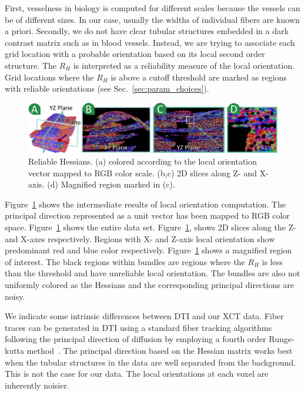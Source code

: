 First, vesselness in biology is computed for different scales because the vessels can be of different sizes. In our case, usually the widths of individual fibers are known a priori.
Secondly, we do not have clear tubular structures embedded in a dark contrast matrix such as in blood vessels.
Instead, we are trying to associate each grid location  with a probable orientation based on its local second order structure. The $R_{H}$ is interpreted as a reliability measure of the local orientation.
Grid locations where the $R_{H}$ is above a cutoff threshold are marked as regions with reliable orientations (see Sec.~\ref{sec:param_choices}).

\begin{figure}[tb]
\centering
\includegraphics[width=\linewidth]{images/reliable_hessian.eps}
 \vspace{-1.5em}
\caption{Reliable Hessians. (a) \mt colored according to the local orientation vector mapped to RGB color scale. (b,c) 2D slices along Z- and X- axis. (d) Magnified region marked in (c).}
\label{fig:reliable_hessian}
\vskip-0.2cm
\end{figure}
Figure~\ref{fig:reliable_hessian} shows the intermediate results of local orientation computation.
The principal direction represented as a unit vector has been mapped to RGB color space.
Figure~\ref{fig:reliable_hessian} shows the entire data set. 
Figure~\ref{fig:reliable_hessian}, shows 2D slices along the Z- and X-axes respectively. Regions with X- and Z-axis local orientation show predominant red and blue color respectively.   Figure~\ref{fig:reliable_hessian} shows a magnified region of interest. The black regions within bundles are regions where the $R_H$ is less than the threshold and have unreliable local orientation. The bundles are also not uniformly colored as the Hessians and the corresponding principal directions are noisy.

We indicate some intrinsic differences between DTI and our XCT data. Fiber traces can be generated in DTI using a standard fiber tracking algorithms following the principal direction of diffusion by employing a fourth order Runge-kutta method~\cite{Brun2003}. The principal direction based on the Hessian matrix works best when the tubular structures in the data are well separated from the background. This is not the case for our data. The local orientations at each voxel are inherently noisier.
